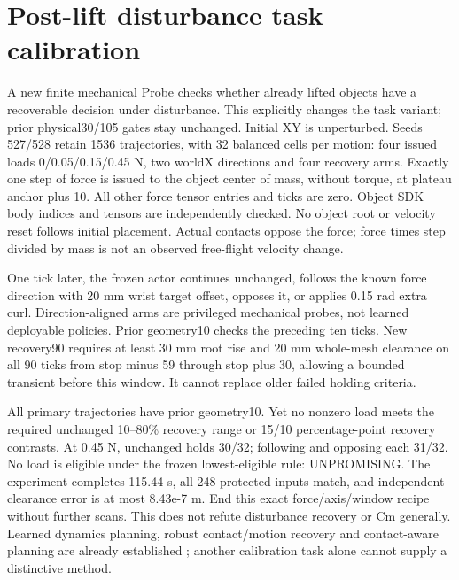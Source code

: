 \documentclass[10pt]{article}
\begin{document}
\section{Post-lift disturbance task calibration}
A new finite mechanical Probe checks whether already lifted objects have a
recoverable decision under disturbance. This explicitly changes the task
variant; prior physical30/105 gates stay unchanged. Initial XY is unperturbed.
Seeds 527/528 retain 1536 trajectories, with 32 balanced cells per motion: four issued
loads 0/0.05/0.15/0.45 N, two worldX directions and four recovery arms. Exactly one
step of force is issued to the object center of mass, without torque, at plateau
anchor plus 10. All other force tensor entries and ticks are zero. Object SDK
body indices and tensors are independently checked. No object root or velocity
reset follows initial placement. Actual contacts oppose the force; force times
step divided by mass is not an observed free-flight velocity change.

One tick later, the frozen actor continues unchanged, follows the known force
direction with 20 mm wrist target offset, opposes it, or applies 0.15 rad extra curl.
Direction-aligned arms are privileged mechanical probes, not learned deployable
policies. Prior geometry10 checks the preceding ten ticks. New recovery90 requires
at least 30 mm root rise and 20 mm whole-mesh clearance on all 90 ticks from stop minus 59
through stop plus 30, allowing a bounded transient before this window. It cannot
replace older failed holding criteria.

\begin{table}[h]
\centering

\caption{Primary-motion mechanical calibration. Counts are actual executed trajectories; no Cm or policy training occurs. All other motions and both seeds are also reported in the retained results.}
\end{table}

All primary trajectories have prior geometry10. Yet no nonzero load meets the
required unchanged 10--80\% recovery range or 15/10 percentage-point recovery contrasts.
At 0.45 N, unchanged holds 30/32; following and opposing each 31/32. No load is
eligible under the frozen lowest-eligible rule: UNPROMISING. The experiment
completes 115.44 s, all 248 protected inputs match, and independent clearance error
is at most 8.43e-7 m. End this exact force/axis/window recipe without further scans.
This does not refute disturbance recovery or Cm generally. Learned dynamics
planning, robust contact/motion recovery and contact-aware planning are already
established \cite{nagabandi2020,jiang2025,suh2026}; another calibration task alone
cannot supply a distinctive method.
\end{document}
